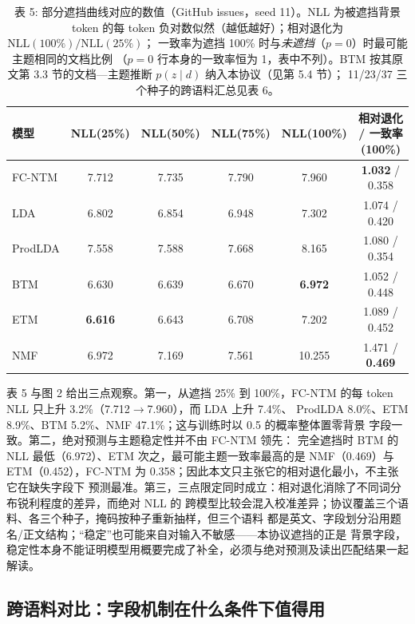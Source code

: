 \documentclass{article}
\begin{document}
\begin{table}[t]
\centering
\caption{表 5: 部分遮挡曲线对应的数值（GitHub issues，seed 11）。NLL 为被遮挡背景 token 的每
token 负对数似然（越低越好）；相对退化为 $\mathrm{NLL}(100\%)/\mathrm{NLL}(25\%)$；
一致率为遮挡 100\% 时与\emph{未遮挡}（$p=0$）时最可能主题相同的文档比例
（$p=0$ 行本身的一致率恒为 1，表中不列）。BTM 按其原文第 3.3 节的文档—主题推断
$p(z\mid d)$ 纳入本协议（见第 5.4 节）；
11/23/37 三个种子的跨语料汇总见表 6。}
\label{tab:occl-robust}
\small
\setlength{\tabcolsep}{4pt}
\begin{tabular}{@{}lccccc@{}}
\toprule
模型 & NLL(25\%) & NLL(50\%) & NLL(75\%) & NLL(100\%) & 相对退化 / 一致率(100\%) \\
\midrule
FC-NTM & 7.712 & 7.735 & 7.790 & 7.960 & \textbf{1.032} / 0.358 \\
LDA & 6.802 & 6.854 & 6.948 & 7.302 & 1.074 / 0.420 \\
ProdLDA & 7.558 & 7.588 & 7.668 & 8.165 & 1.080 / 0.354 \\
BTM & 6.630 & 6.639 & 6.670 & \textbf{6.972} & 1.052 / 0.448 \\
ETM & \textbf{6.616} & 6.643 & 6.708 & 7.202 & 1.089 / 0.452 \\
NMF & 6.972 & 7.169 & 7.561 & 10.255 & 1.471 / \textbf{0.469} \\
\bottomrule
\end{tabular}
\end{table}

表 5 与图 2 给出三点观察。第一，从遮挡 25\% 到
100\%，FC-NTM 的每 token NLL 只上升 3.2\%（7.712$\rightarrow$7.960），而 LDA 上升 7.4\%、
ProdLDA 8.0\%、ETM 8.9\%、BTM 5.2\%、NMF 47.1\%；这与训练时以 0.5 的概率整体置零背景
字段一致。第二，绝对预测与主题稳定性并不由 FC-NTM 领先：
完全遮挡时 BTM 的 NLL 最低（6.972）、ETM 次之，最可能主题一致率最高的是 NMF（0.469）与
ETM（0.452），FC-NTM 为 0.358；因此本文只主张它的相对退化最小，不主张它在缺失字段下
预测最准。第三，三点限定同时成立：相对退化消除了不同词分布锐利程度的差异，而绝对 NLL 的
跨模型比较会混入校准差异；协议覆盖三个语料、各三个种子，掩码按种子重新抽样，但三个语料
都是英文、字段划分沿用题名/正文结构；“稳定”也可能来自对输入不敏感——本协议遮挡的正是
背景字段，稳定性本身不能证明模型用概要完成了补全，必须与绝对预测及读出匹配结果一起解读。

\subsection{跨语料对比：字段机制在什么条件下值得用}
\label{sec:cross-corpus}
\end{document}
